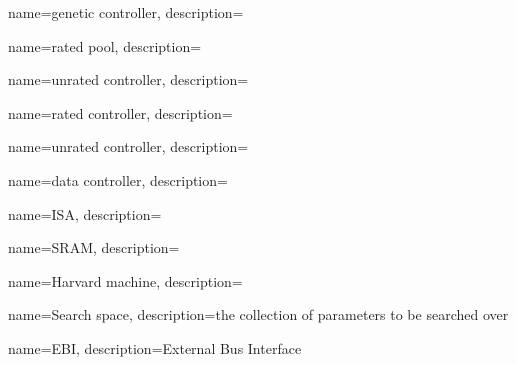 {
name=genetic controller,
description={}
}

{
name=rated pool,
description={}
}

{
name=unrated controller,
description={}
}

{
name=rated controller,
description={}
}

{
name=unrated controller,
description={}
}

{
name=data controller,
description={}
}

{
name=ISA,
description={}
}

{
name=SRAM,
description={}
}

{
name=Harvard machine,
description={}
}

{
name=Search space,
description={the collection of parameters to be searched over}
}

{
name=EBI,
description={External Bus Interface}
}
